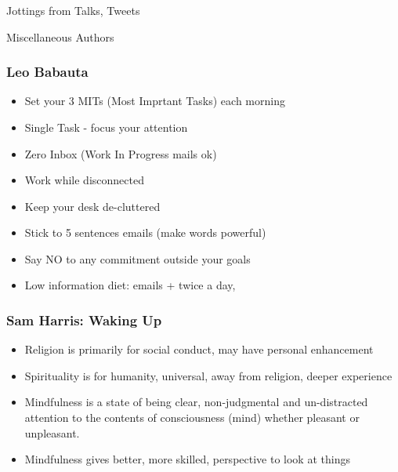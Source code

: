 \begin{frame}[fragile]\frametitle{}
\begin{center}
{\Large Jottings from Talks, Tweets}

{\small Miscellaneous Authors }


\end{center}
\end{frame}


\begin{frame}[fragile]\frametitle{Leo Babauta}

	\begin{itemize}
	\item Set your 3 MITs (Most Imprtant Tasks) each morning
	\item Single Task - focus your attention
	\item Zero Inbox (Work In Progress mails ok)
	\item Work while disconnected
	\item Keep your desk de-cluttered
	\item Stick to 5 sentences emails (make words powerful)
	\item Say NO to any commitment outside your goals
	\item Low information diet: emails + twice a day, 
	\end{itemize}

\end{frame}

\begin{frame}[fragile]\frametitle{Sam Harris: Waking Up}

	\begin{itemize}
	\item Religion is primarily for social conduct, may have personal enhancement
	\item Spirituality is for humanity, universal, away from religion, deeper experience
	\item Mindfulness is a state of being clear, non-judgmental and un-distracted attention to the contents of consciousness (mind) whether pleasant or unpleasant.
	\item Mindfulness gives better, more skilled, perspective to look at things
	\end{itemize}

\end{frame}


